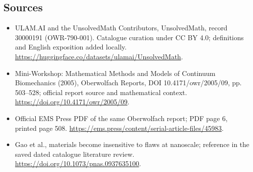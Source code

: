 \documentclass[11pt]{article}
\begin{document}
\subsection{Sources}
\begin{itemize}
\item[\hypertarget{source:30000191:1}{S1}] ULAM.AI and the UnsolvedMath Contributors, UnsolvedMath, record 30000191 (OWR-790-001). Catalogue curation under CC BY 4.0; definitions and English exposition added locally.
\url{https://huggingface.co/datasets/ulamai/UnsolvedMath}.
\item[\hypertarget{source:30000191:2}{S2}] Mini-Workshop: Mathematical Methods and Models of Continuum Biomechanics (2005), Oberwolfach Reports, DOI 10.4171/owr/2005/09, pp. 503--528; official report source and mathematical context.
\url{https://doi.org/10.4171/owr/2005/09}.
\item[\hypertarget{source:30000191:3}{S3}] Official EMS Press PDF of the same Oberwolfach report; PDF page 6, printed page 508.
\url{https://ems.press/content/serial-article-files/45983}.
\item[\hypertarget{source:30000191:4}{S4}] Gao et al., materials become insensitive to flaws at nanoscale; reference in the saved dated catalogue literature review.
\url{https://doi.org/10.1073/pnas.0937635100}.
\end{itemize}
\label{end:30000191}
\end{document}
